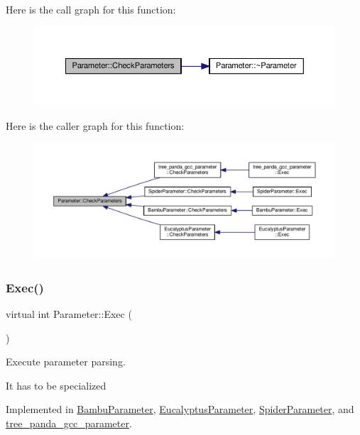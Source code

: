 Here is the call graph for this function\+:
\nopagebreak
\begin{figure}[H]
\begin{center}
\leavevmode
\includegraphics[width=350pt]{dc/dab/classParameter_a87315799c1a893687f796890f5d4f44d_cgraph}
\end{center}
\end{figure}
Here is the caller graph for this function\+:
\nopagebreak
\begin{figure}[H]
\begin{center}
\leavevmode
\includegraphics[width=350pt]{dc/dab/classParameter_a87315799c1a893687f796890f5d4f44d_icgraph}
\end{center}
\end{figure}
\mbox{\label{classParameter_a9f5cc51b6e9ac1e01fe1c5a6362c030b}} 
\subsubsection{\texorpdfstring{Exec()}{Exec()}}
{\footnotesize\ttfamily virtual int Parameter\+::\+Exec (\begin{DoxyParamCaption}{ }\end{DoxyParamCaption})\hspace{0.3cm}{\ttfamily [pure virtual]}}



Execute parameter parsing. 

It has to be specialized 

Implemented in \hyperlink{classBambuParameter_ad89abd3e8793ce6f8324d3acc74b2faa}{Bambu\+Parameter}, \hyperlink{classEucalyptusParameter_ac4a336c1c386a2cbd9adc9dfb637b04b}{Eucalyptus\+Parameter}, \hyperlink{classSpiderParameter_a88ccb6e00f3a60b59e6ecb82e3f1b76d}{Spider\+Parameter}, and \hyperlink{classtree__panda__gcc__parameter_a059ff6cba08daf6710ffa46b2c97e2ee}{tree\+\_\+panda\+\_\+gcc\+\_\+parameter}.

